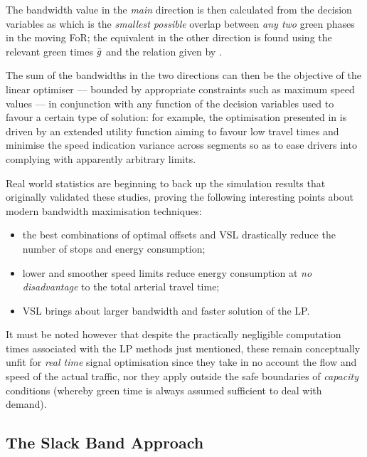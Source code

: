 The bandwidth value in the \emph{main} direction is then calculated from the decision variables as
which is the \emph{smallest possible} overlap between \emph{any two} green phases in the moving FoR; the equivalent in the other direction is found using the relevant green times $\bar{g_{}}$ and the relation given by .

The sum of the bandwidths in the two directions can then be the objective of the linear
optimiser — bounded by appropriate constraints such as maximum speed values — in conjunction with any function of the decision variables used to favour a certain type of solution: for example, the optimisation presented in \citep{de2015arterial} is driven by an extended utility function aiming to favour low travel times and minimise the speed indication variance across segments so as to ease drivers into complying with apparently arbitrary limits.

Real world statistics are beginning to back up the simulation results that originally validated these studies, proving the following interesting points about modern bandwidth maximisation techniques:
\begin{itemize}
\item the best combinations of optimal offsets and VSL drastically reduce the number of stops and energy consumption;
\item lower and smoother speed limits reduce energy consumption at \emph{no disadvantage }to the total arterial travel time;
\item VSL brings about larger bandwidth and faster solution of the LP.
\end{itemize}

It must be noted however that despite the practically negligible computation times associated with the LP methods just mentioned, these remain conceptually unfit for \emph{real time} signal optimisation since they take in no account the flow and speed of the actual traffic, nor they apply outside the safe boundaries of \emph{capacity} conditions (whereby green time is always assumed sufficient to deal with demand).

\subsection{The Slack Band Approach} \label{s:slackband}
